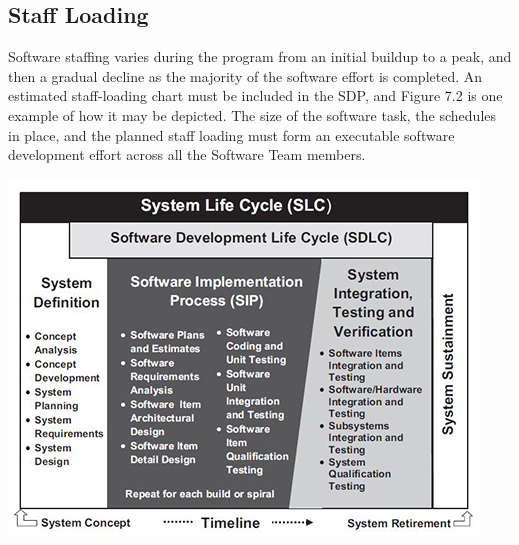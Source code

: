 \documentclass{book}
\begin{document}
\subsection{Staff Loading}

Software staffing varies during the program from an initial
buildup to a peak, and then a gradual decline as the majority
of the software effort is completed. An estimated staff-loading
chart must be included in the SDP, and Figure 7.2 is one
example of how it may be depicted. The size of the software
task, the schedules in place, and the planned staff loading
must form an executable software development effort across
all the Software Team members.

\includegraphics{1.jpg}
\end{document}
